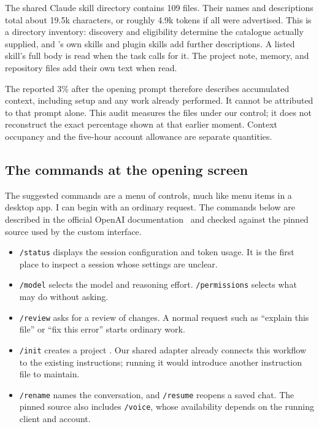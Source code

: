 \documentclass[11pt,a4paper]{article}
\begin{document}
The shared Claude skill directory contains 109  files. Their names and descriptions total about 19.5k characters, or roughly 4.9k tokens if all were advertised. This is a directory inventory: discovery and eligibility determine the catalogue actually supplied, and 's own skills and plugin skills add further descriptions. A listed skill's full body is read when the task calls for it. The project note, memory, and repository files add their own text when read.

The reported 3\% after the opening prompt therefore describes accumulated context, including setup and any work already performed. It cannot be attributed to that prompt alone. This audit measures the files under our control; it does not reconstruct the exact percentage shown at that earlier moment. Context occupancy and the five-hour account allowance are separate quantities.

\subsection{The commands at the opening screen}

The suggested commands are a menu of controls, much like menu items in a desktop app. I can begin with an ordinary request. The commands below are described in the official OpenAI documentation~\cite{codexcommands} and checked against the pinned  source used by the custom interface.

\begin{itemize}[leftmargin=1.2em]
  \item \texttt{/status} displays the session configuration and token usage. It is the first place to inspect a session whose settings are unclear.
  \item \texttt{/model} selects the model and reasoning effort. \texttt{/permissions} selects what  may do without asking.
  \item \texttt{/review} asks for a review of changes. A normal request such as ``explain this file'' or ``fix this error'' starts ordinary work.
  \item \texttt{/init} creates a project . Our shared adapter already connects this workflow to the existing instructions; running it would introduce another instruction file to maintain.
  \item \texttt{/rename} names the conversation, and \texttt{/resume} reopens a saved chat. The pinned source also includes \texttt{/voice}, whose availability depends on the running client and account.
\end{itemize}
\end{document}
